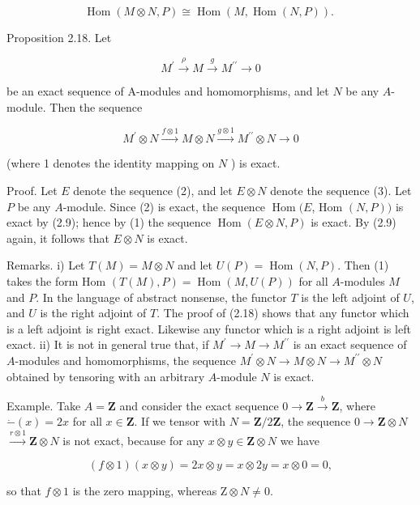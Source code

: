 \documentclass{standalone}
\theoremstyle{definition}
\theoremstyle{remark}
\begin{document}
\[
\operatorname{Hom}(M \otimes N, P) \cong \operatorname{Hom}(M, \operatorname{Hom}(N, P)) \text {. }
\]

Proposition 2.18. Let

\[
M^{\prime} \stackrel{\rho}{\rightarrow} M \stackrel{g}{\rightarrow} M^{\prime \prime} \rightarrow 0
\]

be an exact sequence of A-modules and homomorphisms, and let $N$ be any $A$-module. Then the sequence

\[
M^{\prime} \otimes N \stackrel{f \otimes 1}{\longrightarrow} M \otimes N \stackrel{g \otimes 1}{\longrightarrow} M^{\prime \prime} \otimes N \rightarrow 0
\]

(where 1 denotes the identity mapping on $N$ ) is exact.

Proof. Let $E$ denote the sequence (2), and let $E \otimes N$ denote the sequence (3). Let $P$ be any $A$-module. Since (2) is exact, the sequence $\operatorname{Hom}(E$, Hom $(N, P))$ is exact by (2.9); hence by (1) the sequence $\operatorname{Hom}(E \otimes N, P)$ is exact. By (2.9) again, it follows that $E \otimes N$ is exact.

Remarks. i) Let $T(M)=M \otimes N$ and let $U(P)=\operatorname{Hom}(N, P)$. Then (1) takes the form Hom $(T(M), P)=\operatorname{Hom}(M, U(P))$ for all $A$-modules $M$ and $P$. In the language of abstract nonsense, the functor $T$ is the left adjoint of $U$, and $U$ is the right adjoint of $T$. The proof of (2.18) shows that any functor which is a left adjoint is right exact. Likewise any functor which is a right adjoint is left exact. ii) It is not in general true that, if $M^{\prime} \rightarrow M \rightarrow M^{\prime \prime}$ is an exact sequence of $A$-modules and homomorphisms, the sequence $M^{\prime} \otimes N \rightarrow M \otimes N \rightarrow M^{\prime \prime} \otimes N$ obtained by tensoring with an arbitrary $A$-module $N$ is exact.

Example. Take $A=\mathbf{Z}$ and consider the exact sequence $0 \rightarrow \mathbf{Z} \stackrel{b}{\rightarrow} \mathbf{Z}$, where $\dot{-}(x)=2 x$ for all $x \in \mathbf{Z}$. If we tensor with $N=\mathbf{Z} / 2 \mathbf{Z}$, the sequence $0 \rightarrow \mathbf{Z} \otimes N$ $\stackrel{r \otimes 1}{\longrightarrow} \mathbf{Z} \otimes N$ is not exact, because for any $x \otimes y \in \mathbf{Z} \otimes N$ we have

\[
(f \otimes 1)(x \otimes y)=2 x \otimes y=x \otimes 2 y=x \otimes 0=0,
\]

so that $f \otimes 1$ is the zero mapping, whereas $\mathrm{Z} \otimes N \neq 0$.
\end{document}
